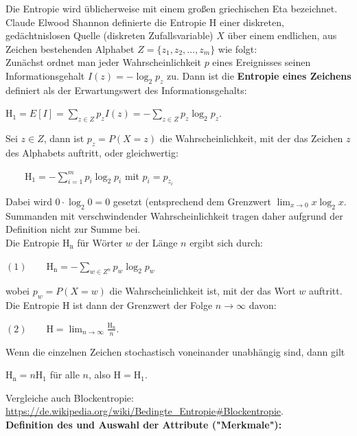 \documentclass[12pt]{article}
\begin{document}
Die Entropie wird üblicherweise mit einem großen griechischen Eta   bezeichnet. Claude Elwood Shannon definierte die Entropie $ \mathrm{H} $ einer diskreten, gedächtnislosen Quelle (diskreten Zufallsvariable) $ X $ über einem endlichen, aus Zeichen bestehenden Alphabet $ Z=\{z_1, z_2, \dots, z_m\}$ wie folgt:\\[0.2cm]
Zunächst ordnet man jeder Wahrscheinlichkeit $ p $ eines Ereignisses seinen Informationsgehalt $ I(z) = -\log_2 p_z $ zu. Dann ist die \textbf{Entropie eines Zeichens} definiert als der Erwartungswert des Informationsgehalts: \
\begin{center}
$ \mathrm{H_1} = E[I]= \sum_{z\in Z} p_z I(z) = - \sum_{z\in Z} p_z \log_2 p_z $.\\
\end{center}
Sei $ z \in Z $, dann ist $ p_z = P(X=z) $ die Wahrscheinlichkeit, mit der das Zeichen $ z $ des Alphabets auftritt, oder gleichwertig:\\ 
\begin{center}
$ \qquad \mathrm{H_1} = - \sum_{i=1}^{m} p_i \log_2 p_i $ mit $ p_i = p_{z_i} $ 
\end{center}
Dabei wird $ 0\cdot\log_2 0=0 $ gesetzt (entsprechend dem Grenzwert $  \lim_{x \rightarrow 0} x \log_2 x $. Summanden mit verschwindender Wahrscheinlichkeit tragen daher aufgrund der Definition nicht zur Summe bei.\\[0.2cm]
Die Entropie $ \mathrm{H_n} $ für Wörter $ w $ der Länge $ n $ ergibt sich durch:
\begin{center}
$ (1) \qquad \mathrm{H_n} = -\sum_{w \in Z^n} p_w \log_2 p_w $
\end{center}
wobei $ p_w  = P(X=w)$ die Wahrscheinlichkeit ist, mit der das Wort $  w $ auftritt. \\[0.2cm]
Die Entropie $ \mathrm{H} $ ist dann der Grenzwert der Folge $ n\to \infty $ davon:
\begin{center}
$ (2)\qquad \mathrm{H} = \lim_{n\to \infty} \frac {\mathrm{H_n}}{n} $.
\end{center}
Wenn die einzelnen Zeichen stochastisch voneinander unabhängig sind, dann gilt
\begin{center}
 $ \mathrm{H_n} = n \mathrm{H_1} $ für alle $ n $, also $ \mathrm{H} = \mathrm{H_1} $. 
\end{center} 
%
Vergleiche auch Blockentropie: \url{https://de.wikipedia.org/wiki/Bedingte_Entropie#Blockentropie}.\\[0.4cm]
% 
\textbf{Definition des {\color{blue}{ID3-Verfahrens}}  und Auswahl der Attribute ("Merkmale"):}\\[0.3cm]
\end{document}
